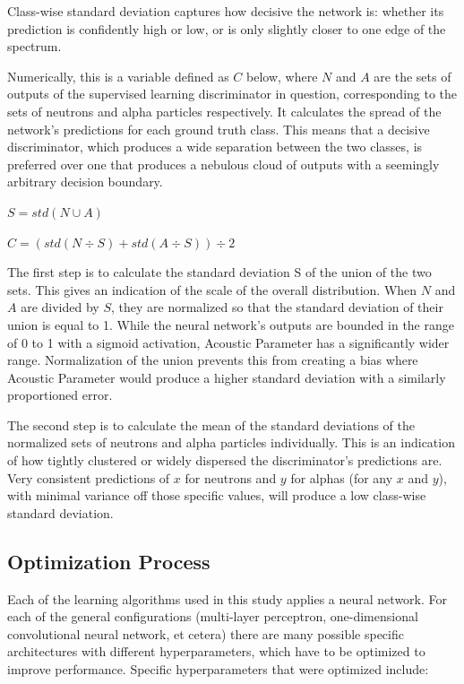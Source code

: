 \documentclass[10pt]{article}
\begin{document}
Class-wise standard deviation captures how decisive the network is: whether its prediction is confidently high or low, or is only slightly closer to one edge of the spectrum.

Numerically, this is a variable defined as $C$ below, where $N$ and $A$ are the sets of outputs of the supervised learning discriminator in question, corresponding to the sets of neutrons and alpha particles respectively. It calculates the spread of the network's predictions for each ground truth class. This means that a decisive discriminator, which produces a wide separation between the two classes, is preferred over one that produces a nebulous cloud of outputs with a seemingly arbitrary decision boundary.

$S=std(N \cup A)$

$C=(std(N \div S) + std(A \div S)) \div 2$

The first step is to calculate the standard deviation S of the union of the two sets. This gives an indication of the scale of the overall distribution. When $N$ and $A$ are divided by $S$, they are normalized so that the standard deviation of their union is equal to 1. While the neural network’s outputs are bounded in the range of 0 to 1 with a sigmoid activation, Acoustic Parameter has a significantly wider range. Normalization of the union prevents this from creating a bias where Acoustic Parameter would produce a higher standard deviation with a similarly proportioned error.

The second step is to calculate the mean of the standard deviations of the normalized sets of neutrons and alpha particles individually. This is an indication of how tightly clustered or widely dispersed the discriminator’s predictions are. Very consistent predictions of $x$ for neutrons and $y$ for alphas (for any $x$ and $y$), with minimal variance off those specific values, will produce a low class-wise standard deviation.

\subsection{Optimization Process}

Each of the learning algorithms used in this study applies a neural network. For each of the general configurations (multi-layer perceptron, one-dimensional convolutional neural network, et cetera) there are many possible specific architectures with different hyperparameters, which have to be optimized to improve performance. Specific hyperparameters that were optimized include:
\end{document}
